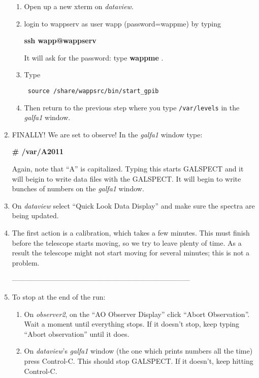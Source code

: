 \begin{enumerate}
\begin{enumerate}
	\item Open up a new xterm on {\it dataview}.

	\item login to wappserv as user wapp (password=wappme) by typing

{\bf ssh wapp@wappserv}

It will ask for the password: type {\bf wappme} .

	\item Type

\verb$ source /share/wappsrc/bin/start_gpib$

	\item Then return to the previous step where you type
\verb$/var/levels$ in the {\it galfa1} window.

\end{enumerate}

                                                                        
\item FINALLY! We are set to observe! In the {\it galfa1} window type:

{\bf \# /var/A2011 }

Again, note that ``A'' is capitalized.  Typing this starts GALSPECT and
it will beigin to write data files with the GALSPECT. It will begin to
write bunches of numbers on the {\it galfa1} window.

\item On {\it dataview} select ``Quick Look Data Display'' and make sure the spectra
   are being updated. 

\item The first action is a calibration, which takes a few minutes. This
must finish before the telescope starts moving, so we try to leave
plenty of time.  As a result the telescope might not start moving for
several minutes; this is not a problem. 

---------------------------------------------------------------------------


\item  To stop at the end of the run: \begin{enumerate}

\item On {\it observer2}, on the ``AO Observer Display'' click ``Abort
Observation''. Wait a moment until everything stops. If it doesn't stop,
keep typing ``Abort observation'' until it does.

\item On {\it dataview}'s {\it galfa1} window (the
one which prints numbers all the time) press Control-C. This should stop
GALSPECT. If it doesn't, keep hitting Control-C.


\end{enumerate}
\end{enumerate}
